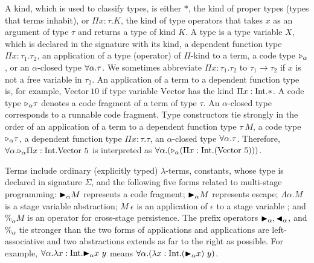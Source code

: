 


A kind, which is used to classify types, is either $*$, the kind of
proper types (types that terms inhabit), or $\Pi x\colon\tau.K$, the kind
of type operators that takes $x$ as an argument of type $\tau$ and returns a type
of kind $K$.
A type is a type variable $X$, which is declared in the signature with its kind, a dependent function type $\Pi x:\tau_1.\tau_2$,
an application of a type (operator) of $\Pi$-kind to a term, a code type ${\mathop{\triangleright}}_\alpha$, or an $\alpha$-closed type $\forall\alpha.\tau$.
We sometimes abbreviate $\Pi x:\tau_1.\tau_2$ to $\tau_1 \rightarrow \tau_2$ if
$x$ is not a free variable in $\tau_2$. 
An application of a term to a dependent function type  is, for example, $\text{Vector}\ 10$
if type variable $\text{Vector}$ has the kind $\Pi x:\textrm{Int}.*$.
A code type ${\mathop{\triangleright}}_\alpha \tau$ denotes a code fragment of a term of type $\tau$.
An $\alpha$-closed type corresponds to a runnable code fragment.
Type constructors tie strongly  in the order of 
an application of a term to a dependent function type $\tau\ M$,
a code type ${\mathop{\triangleright}}_{\alpha} \tau$,
a dependent function type $\Pi x:\tau.\tau$, 
an $\alpha$-closed type $\forall\alpha.\tau$.
Therefore, $\F\alpha.\TW_{\alpha} \Pi x:\I.\text{Vector}\ 5$ is interpreted as
$\F\alpha.(\TW_{\alpha} (\Pi x:\I.(\text{Vector}\ 5)))$. 


Terms include ordinary (explicitly typed) \(\lambda\)-terms, constants,
whose type is declared in signature $\Sigma$, and the following five forms
related to multi-stage programming:
${\mathop{\blacktriangleright}}_\alpha M$ represents a code fragment; ${\mathop{\blacktriangleright}}_\alpha M$ represents escape;
$\Lambda\alpha.M$ is a stage variable abstraction;
$M\ \epsilon$ is an application of $\epsilon$ to a stage variable ; and 
$\%_\alpha M$ is an operator for cross-stage persistence.
The prefix operators ${\mathop{\blacktriangleright}}_\alpha, {\mathop{\blacktriangleleft}}_\alpha$, and $\%_\alpha$ tie stronger than the two forms of applications
and applications are left-associative
and two abstractions extends as far to the right as possible.
For example, $\forall\alpha.\lambda x:\textrm{Int}.{\mathop{\blacktriangleright}}_\alpha x\ y$ means $\F\alpha.(\lambda x:\I.(\TB_\alpha x)\ y)$.

